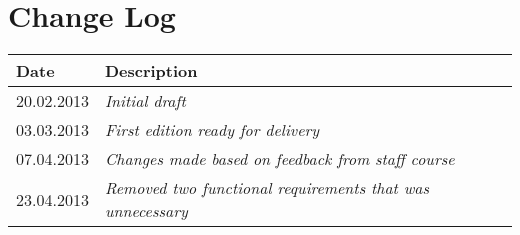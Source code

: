 \section{Change Log}
\label{sec:changelog}
\begin{tabular}{|l|l|}
\hline
Date & Description \\ \hline
20.02.2013 & \emph{Initial draft\/} \\ \hline
03.03.2013 & \emph{First edition ready for delivery\/} \\ \hline
07.04.2013 & \emph{Changes made based on feedback from staff course\/} \\ \hline
23.04.2013 & \emph{Removed two functional requirements that was unnecessary} \\ \hline
\end{tabular}
